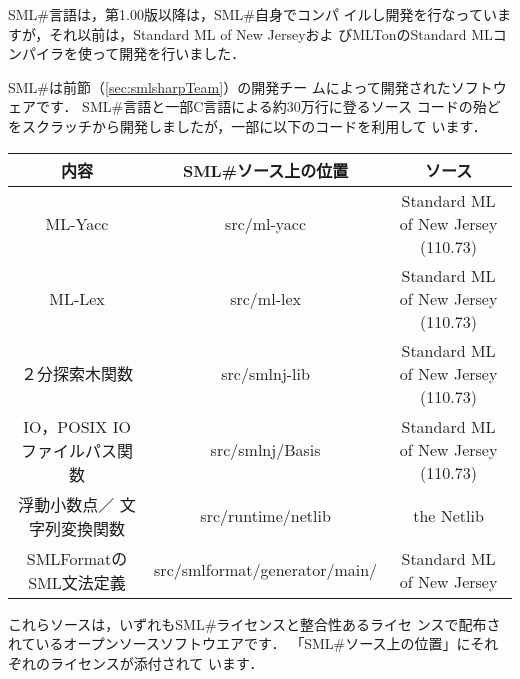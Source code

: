 \documentclass{jbook}
\newcommand{\smlsharp}{SML\#}
\newcommand{\version}{1.00}
\newcommand{\smlsharpSize}{30万}
\begin{document}
	\smlsharp{}言語は，第\version{}版以降は，\smlsharp{}自身でコンパ
イルし開発を行なっていますが，それ以前は，Standard ML of New Jerseyおよ
びMLTonのStandard MLコンパイラを使って開発を行いました．

	\smlsharp{}は前節（\ref{sec:smlsharpTeam}）の開発チー
ムによって開発されたソフトウェアです．
	\smlsharp{}言語と一部C言語による約\smlsharpSize{}行に登るソース
コードの殆どをスクラッチから開発しましたが，一部に以下のコードを利用して
います．

\begin{center}
\begin{tabular}{|c|c|c|}
\hline
内容 & \smlsharp{}ソース上の位置 & ソース
\\\hline
ML-Yacc & src/ml-yacc  & Standard ML of New Jersey (110.73)
\\\hline
ML-Lex & src/ml-lex  & Standard ML of New Jersey (110.73)
\\\hline
２分探索木関数 & src/smlnj-lib &  Standard ML of New Jersey (110.73)
\\\hline
IO，POSIX IO
ファイルパス関数
&
src/smlnj/Basis
&
Standard ML of New Jersey (110.73)
\\\hline
浮動小数点／
文字列変換関数
&
src/runtime/netlib
&
the Netlib
\\\hline
SMLFormatの
SML文法定義
&
src/smlformat/generator/main/
&
Standard ML of New Jersey
\\\hline
\end{tabular}
\end{center}
	これらソースは，いずれも\smlsharp{}ライセンスと整合性あるライセ
ンスで配布されているオープンソースソフトウエアです．
	「\smlsharp{}ソース上の位置」にそれぞれのライセンスが添付されて
います．
\end{document}
